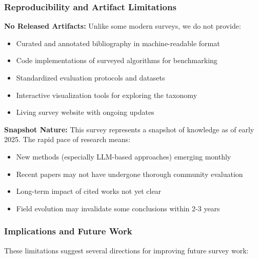 \subsubsection{Reproducibility and Artifact Limitations}

\textbf{No Released Artifacts:} Unlike some modern surveys, we do not provide:
\begin{itemize}
    \item Curated and annotated bibliography in machine-readable format
    \item Code implementations of surveyed algorithms for benchmarking
    \item Standardized evaluation protocols and datasets
    \item Interactive visualization tools for exploring the taxonomy
    \item Living survey website with ongoing updates
\end{itemize}

\textbf{Snapshot Nature:} This survey represents a snapshot of knowledge as of early 2025. The rapid pace of research means:
\begin{itemize}
    \item New methods (especially LLM-based approaches) emerging monthly
    \item Recent papers may not have undergone thorough community evaluation
    \item Long-term impact of cited works not yet clear
    \item Field evolution may invalidate some conclusions within 2-3 years
\end{itemize}

\subsubsection{Implications and Future Work}

These limitations suggest several directions for improving future survey work:

